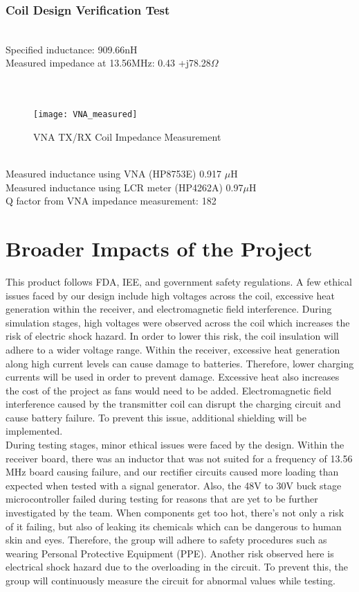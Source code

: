 \documentclass[12pt]{article}
\begin{document}
\subsubsection*{Coil Design Verification Test}\hfill \\
\noindent
Specified inductance: 909.66nH\\ 
Measured impedance at 13.56MHz: 0.43 +j78.28$\Omega$\\
\hfill \\
\pagebreak
\hfill \\
\begin{figure}[h!]
\centering
\texttt{[image: VNA\_measured]}
\caption{VNA TX/RX Coil Impedance Measurement}
\end{figure}
\hfill \\
\noindent 
Measured inductance using VNA (HP8753E) 0.917 $\mu$H\\
Measured inductance using LCR meter (HP4262A) 0.97$\mu$H\\
Q factor from VNA impedance measurement: 182
\hfill
\pagebreak
\section{Broader Impacts of the Project}

\indent
This product follows FDA, IEE, and government safety regulations. A few ethical issues faced by our design include high voltages across the coil, excessive heat generation within the receiver, and electromagnetic field interference. During simulation stages, high voltages were observed across the coil which increases the risk of electric shock hazard. In order to lower this risk, the coil insulation will adhere to a wider voltage range. Within the receiver, excessive heat generation along high current levels can cause damage to batteries. Therefore, lower charging currents will be used in order to prevent damage. Excessive heat also increases the cost of the project as fans would need to be added. Electromagnetic field interference caused by the transmitter coil can disrupt the charging circuit and cause battery failure. To prevent this issue, additional shielding will be implemented. \\

\indent
During testing stages, minor ethical issues were faced by the design. Within the receiver board, there was an inductor that was not suited for a frequency of 13.56 MHz board causing failure, and our rectifier circuits caused more loading than expected when tested with a signal generator. Also, the 48V to 30V buck stage microcontroller failed during testing for reasons that are yet to be further investigated by the team. When components get too hot, there’s not only a risk of it failing, but also of leaking its chemicals which can be dangerous to human skin and eyes. Therefore, the group will adhere to safety procedures such as wearing Personal Protective Equipment (PPE). Another risk observed here is electrical shock hazard due to the overloading in the circuit. To prevent this, the group will continuously measure the circuit for abnormal values while testing.\\
\end{document}
